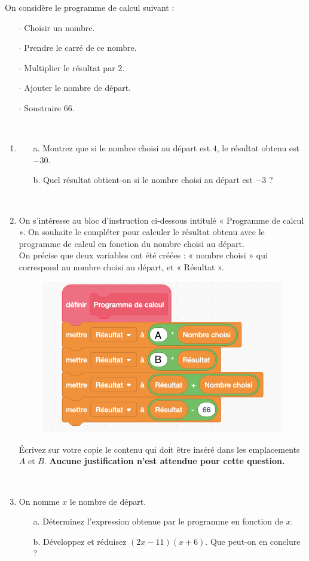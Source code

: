\documentclass[11pt]{article}
\begin{document}
 On considère le programme de calcul suivant : \begin{itemize}
 \item[$\cdot$] Choisir un nombre. 
 \item [$\cdot$] Prendre le carré de ce nombre.
 \item [$\cdot$] Multiplier le résultat par $2$. 
 \item [$\cdot$] Ajouter le nombre de départ. 
 \item [$\cdot$] Soustraire $66$. 
 \end{itemize}
 \ \\
 \begin{enumerate}
 
 \item \begin{itemize}
 \item[a.] Montrez que si le nombre choisi au départ est $4$, le résultat obtenu est $-30$. 
 \item[b.] Quel résultat obtient-on si le nombre choisi au départ est $-3$ ? 
 \end{itemize}
 \ \\ 
 \item On s'intéresse au bloc d'instruction ci-dessous intitulé « Programme de calcul ». On souhaite le compléter pour calculer le résultat obtenu avec le programme de calcul en fonction du nombre choisi au départ. \\
 On précise que deux variables ont été créées : « nombre choisi » qui correspond au nombre choisi au départ, et « Résultat ». 
 \begin{figure}[H]
 \includegraphics[scale=1]{Exo4}
 \end{figure}
 Écrivez sur votre copie le contenu qui doit être inséré dans les emplacements $A$ et $B$. \textbf{Aucune justification n'est attendue pour cette question.}
 
 \ \\ 
 \item On nomme $x$ le nombre de départ. \begin{itemize}
 \item[a.] Déterminez l'expression obtenue par le programme en fonction de $x$.
 \item[b.] Développez et réduisez $(2x-11)(x+6)$. Que peut-on en conclure ? 
 \end{itemize}
 \end{enumerate}
 
\end{document}
